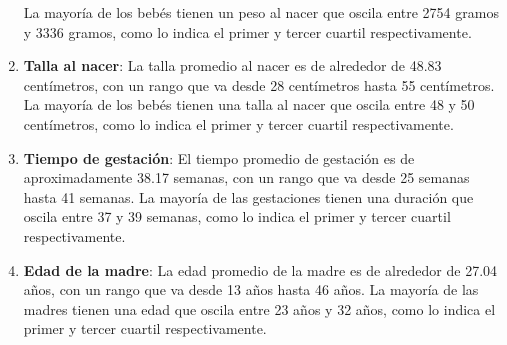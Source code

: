 \documentclass[
]{book}
\begin{document}
\begin{enumerate}
La mayoría de los bebés tienen un peso al nacer que oscila entre 2754 gramos y 3336 gramos, como lo indica el primer y tercer cuartil respectivamente.
\item
  \textbf{Talla al nacer}: La talla promedio al nacer es de alrededor de 48.83 centímetros, con un rango que va desde 28 centímetros hasta 55 centímetros. La mayoría de los bebés tienen una talla al nacer que oscila entre 48 y 50 centímetros, como lo indica el primer y tercer cuartil respectivamente.
\item
  \textbf{Tiempo de gestación}: El tiempo promedio de gestación es de aproximadamente 38.17 semanas, con un rango que va desde 25 semanas hasta 41 semanas. La mayoría de las gestaciones tienen una duración que oscila entre 37 y 39 semanas, como lo indica el primer y tercer cuartil respectivamente.
\item
  \textbf{Edad de la madre}: La edad promedio de la madre es de alrededor de 27.04 años, con un rango que va desde 13 años hasta 46 años. La mayoría de las madres tienen una edad que oscila entre 23 años y 32 años, como lo indica el primer y tercer cuartil respectivamente.
\end{enumerate}

  
\end{document}
